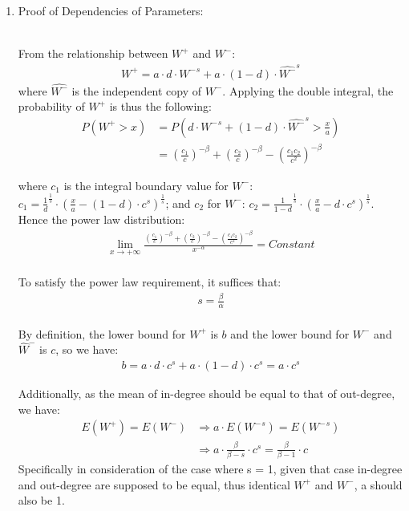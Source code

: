 \documentclass{article}
\begin{document}
\begin{enumerate}
\item  \hypertarget{pf_of_dependency}{Proof of Dependencies of Parameters:} \\
From the relationship between $W^{+}$ and $W^{-}$: 
  \begin{align*}
 W^{+} = a \cdot d \cdot{W^{-}}^{s} + a \cdot (1-d) \cdot {\hat{W^{-}}} ^{s} 
 \end{align*}
 where $\hat{W^{-}}$ is the independent copy of $W^{-}$. Applying the double integral, the probability of $W^{+}$ is thus the following:
  \begin{align*}
 P( W^{+} > x ) & = P( d \cdot{W^{-}}^{s} + (1 - d) \cdot {\hat{W^{-}}} ^{s} > \frac{x}{a} ) \\
          & =  {(\frac{c_{1}}{c})}^{-\beta} +  {(\frac{c_{2}}{c})}^{-\beta} -  {(\frac{ c_{1}c_{2}   }{ c^{2} })}^{-\beta}
 \end{align*}
 
 where $c_{1}$ is the integral boundary value for $W^{-}$: $c_{1} = {\frac{1}{d}}^{\frac{1}{s}} \cdot {( \frac{x}{a} - (1-d) \cdot c^{s})}^{\frac{1}{s}}$; and $c_{2}$ for $\hat{W^{-}}$: 
 $c_{2} = {\frac{1}{1-d}}^{\frac{1}{s}} \cdot {( \frac{x}{a} - d \cdot c^{s})}^{\frac{1}{s}}$. Hence the power law distribution:
 \begin{align*}
\lim_{x \rightarrow +\infty } \frac{ {(\frac{c_{1}}{c})}^{-\beta} +  {(\frac{c_{2}}{c})}^{-\beta} -  {(\frac{ c_{1}c_{2}   }{ c^{2} })}^{-\beta}  }{x^{-\alpha}} = Constant
\end{align*}
 \quad\\

To satisfy the power law requirement, it suffices that:
  \begin{align*}
  s = \frac{\beta} {\alpha} 
 \end{align*}
 \quad\\
 By definition, the lower bound for $W^{+}$ is $b$ and the lower bound for $W^-$ and $\hat{W}^-$ is $c$, so we have:
   \begin{align*}
  b = a \cdot d \cdot c^{s} + a \cdot (1-d) \cdot c^{s} = a \cdot c^{s}
 \end{align*}
 
 Additionally, as the mean of in-degree should be equal to that of out-degree, we have: 
  \begin{align*}
  E(W^{+}) = E(W^{-})  & \Rightarrow    a \cdot E({W^{-}}^{s}) = E({W^{-}}^{s})  \\
 & \Rightarrow    a \cdot \frac{\beta}{\beta - s} \cdot c^{s} = \frac{\beta}{\beta-1} \cdot c  
 \end{align*}
 Specifically in consideration of the case where s = 1, given that case in-degree and out-degree are supposed to be equal, thus identical $W^{+}$ and $W^{-}$, a should also be 1.


\end{enumerate}
\end{document}
